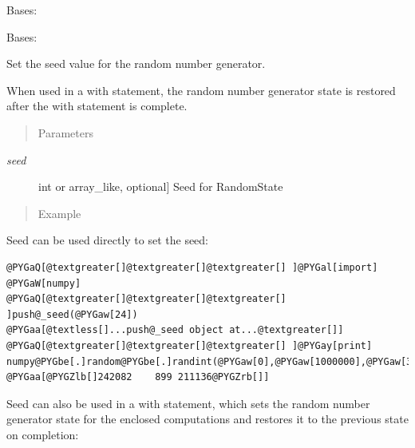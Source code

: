 \documentclass[letterpaper,10pt,english]{sphinxmanual}
\begin{document}

\begin{fulllineitems}
\label{api/util:refl1d.util.pushdir}
Bases: 

\end{fulllineitems}


\begin{fulllineitems}
\label{api/util:refl1d.util.push_seed}
Bases: 

Set the seed value for the random number generator.

When used in a with statement, the random number generator state is
restored after the with statement is complete.
\begin{quote}\begin{description}
\item[{Parameters }] \leavevmode
\end{description}\end{quote}
\begin{description}
\item[{\emph{seed}}] \leavevmode{[}int or array\_like, optional{]}
Seed for RandomState

\end{description}
\begin{quote}\begin{description}
\item[{Example }] \leavevmode
\end{description}\end{quote}

Seed can be used directly to set the seed:

\begin{Verbatim}[commandchars=@\[\]]
@PYGaQ[@textgreater[]@textgreater[]@textgreater[] ]@PYGal[import] @PYGaW[numpy]
@PYGaQ[@textgreater[]@textgreater[]@textgreater[] ]push@_seed(@PYGaw[24]) 
@PYGaa[@textless[]...push@_seed object at...@textgreater[]]
@PYGaQ[@textgreater[]@textgreater[]@textgreater[] ]@PYGay[print] numpy@PYGbe[.]random@PYGbe[.]randint(@PYGaw[0],@PYGaw[1000000],@PYGaw[3])
@PYGaa[@PYGZlb[]242082    899 211136@PYGZrb[]]
\end{Verbatim}

Seed can also be used in a with statement, which sets the random
number generator state for the enclosed computations and restores
it to the previous state on completion:


\end{fulllineitems}
\end{document}
